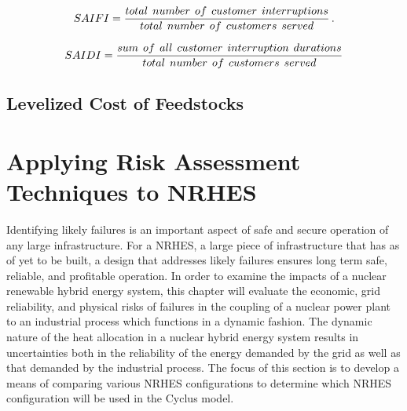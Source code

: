 \documentclass[12pt]{UIdahoMastersThesis}
\begin{document}
\begin{equation*}
SAIFI =\frac{total\hspace{.15 cm} number\hspace{.15 cm} of\hspace{.15 cm} customer\hspace{.15 cm} interruptions}{total\hspace{.15 cm} number\hspace{.15 cm} of\hspace{.15 cm} customers\hspace{.15 cm} served}\,.
\end{equation*}

\begin{equation*}
SAIDI = \frac{sum \hspace{.15 cm} of \hspace{.15 cm}all \hspace{.15 cm}customer\hspace{.15 cm}interruption \hspace{.15 cm} durations}{total\hspace{.15 cm}number\hspace{.15 cm}of\hspace{.15 cm}customers\hspace{.15 cm}served}
\end{equation*}

\section{Levelized Cost of Feedstocks}


\chapter{Applying Risk Assessment Techniques to NRHES}
Identifying likely failures is an important aspect of safe and secure operation of any large infrastructure. For a NRHES, a large piece of infrastructure that has as of yet to be built, a design that addresses likely failures ensures long term safe, reliable, and profitable operation.   In order to examine the impacts of a nuclear renewable hybrid energy system, this chapter will evaluate the economic, grid reliability, and physical risks of failures in the coupling of a nuclear power plant to an industrial process which functions in a dynamic fashion. The dynamic nature of the heat allocation in a nuclear hybrid energy system results in uncertainties both in the reliability of the energy demanded by the grid as well as that demanded by the industrial process. The focus of this section is to develop a means of comparing various NRHES configurations to determine which NRHES configuration will be used in the Cyclus model.
\end{document}
